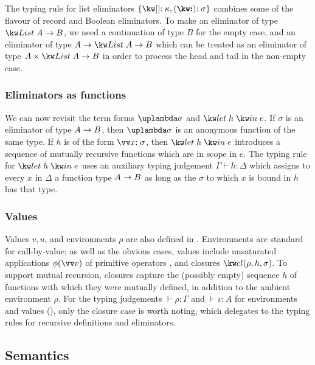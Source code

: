 The typing rule for list eliminators $\elimList{\kappa}{\sigma}$ combines some of the flavour of record and Boolean eliminators. To make an eliminator of type $\tyFun{\tyList{A}}{B}$, we need a continuation of type $B$ for the empty case, and an eliminator of type $\tyFun{A}{\tyFun{\tyList{A}}{B}}$ which can be treated as an eliminator of type $\tyFun{\tyProd{A}{\tyList{A}}}{B}$ in order to process the head and tail in the non-empty case.

\subsubsection{Eliminators as functions}

We can now revisit the term forms $\exLambda{\sigma}$ and $\exLetRecMutual{h}{e}$. If $\sigma$ is an eliminator of type ${A}\rightarrow{B}$, then $\exLambda{\sigma}$ is an anonymous function of the same type. If $h$ is of the form $\vec{\bind{x}{\sigma}}$, then $\exLetRecMutual{h}{e}$ introduces a sequence of mutually recursive functions which are in scope in $e$. The typing rule for $\exLetRecMutual{h}{e}$ uses an auxiliary typing judgement $\Gamma \vdash h : \Delta$ which assigns to every $x$ in $\Delta$ a function type ${A}\rightarrow{B}$ as long as the $\sigma$ to which $x$ is bound in $h$ has that type.



\subsubsection{Values}
Values $v, u$, and environments $\rho$ are also defined in . Environments are standard for call-by-value; as well as the obvious cases, values include unsaturated applications $\exPrimOp{\phi}{\vec{v}}$ of primitive operators , and closures $\exClosure{\rho}{h}{\sigma}$. To support mutual recursion, closures capture the (possibly empty) sequence $h$ of functions with which they were mutually defined, in addition to the ambient environment $\rho$. For the typing judgements $\vdash \rho: \Gamma$ and $\vdash v: A$ for environments and values (), only the closure case is worth noting, which delegates to the typing rules for recursive definitions and eliminators.

\subsection{Semantics}


